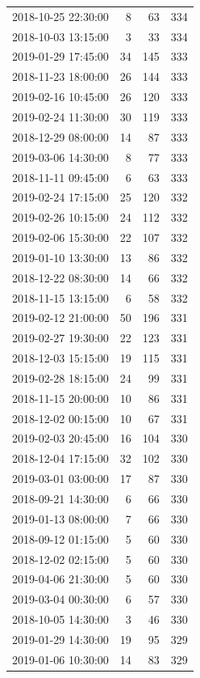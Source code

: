 \begin{tabular}{lrrr}
2018-10-25 22:30:00 & 8 & 63 & 334 \\
2018-10-03 13:15:00 & 3 & 33 & 334 \\
2019-01-29 17:45:00 & 34 & 145 & 333 \\
2018-11-23 18:00:00 & 26 & 144 & 333 \\
2019-02-16 10:45:00 & 26 & 120 & 333 \\
2019-02-24 11:30:00 & 30 & 119 & 333 \\
2018-12-29 08:00:00 & 14 & 87 & 333 \\
2019-03-06 14:30:00 & 8 & 77 & 333 \\
2018-11-11 09:45:00 & 6 & 63 & 333 \\
2019-02-24 17:15:00 & 25 & 120 & 332 \\
2019-02-26 10:15:00 & 24 & 112 & 332 \\
2019-02-06 15:30:00 & 22 & 107 & 332 \\
2019-01-10 13:30:00 & 13 & 86 & 332 \\
2018-12-22 08:30:00 & 14 & 66 & 332 \\
2018-11-15 13:15:00 & 6 & 58 & 332 \\
2019-02-12 21:00:00 & 50 & 196 & 331 \\
2019-02-27 19:30:00 & 22 & 123 & 331 \\
2018-12-03 15:15:00 & 19 & 115 & 331 \\
2019-02-28 18:15:00 & 24 & 99 & 331 \\
2018-11-15 20:00:00 & 10 & 86 & 331 \\
2018-12-02 00:15:00 & 10 & 67 & 331 \\
2019-02-03 20:45:00 & 16 & 104 & 330 \\
2018-12-04 17:15:00 & 32 & 102 & 330 \\
2019-03-01 03:00:00 & 17 & 87 & 330 \\
2018-09-21 14:30:00 & 6 & 66 & 330 \\
2019-01-13 08:00:00 & 7 & 66 & 330 \\
2018-09-12 01:15:00 & 5 & 60 & 330 \\
2018-12-02 02:15:00 & 5 & 60 & 330 \\
2019-04-06 21:30:00 & 5 & 60 & 330 \\
2019-03-04 00:30:00 & 6 & 57 & 330 \\
2018-10-05 14:30:00 & 3 & 46 & 330 \\
2019-01-29 14:30:00 & 19 & 95 & 329 \\
2019-01-06 10:30:00 & 14 & 83 & 329 \\

\end{tabular}
